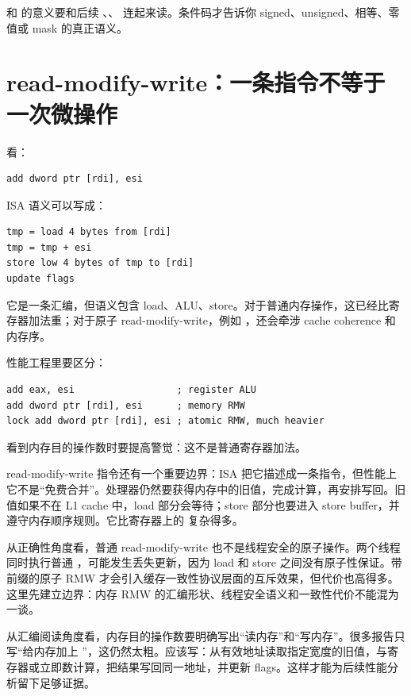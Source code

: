 \begin{keyidea}
 和  的意义要和后续 、、 连起来读。条件码才告诉你 signed、unsigned、相等、零值或 mask 的真正语义。
\end{keyidea}

\section{read-modify-write：一条指令不等于一次微操作}

看：

\begin{lstlisting}
add dword ptr [rdi], esi
\end{lstlisting}

ISA 语义可以写成：

\begin{lstlisting}
tmp = load 4 bytes from [rdi]
tmp = tmp + esi
store low 4 bytes of tmp to [rdi]
update flags
\end{lstlisting}

它是一条汇编，但语义包含 load、ALU、store。对于普通内存操作，这已经比寄存器加法重；对于原子 read-modify-write，例如 ，还会牵涉 cache coherence 和内存序。

性能工程里要区分：

\begin{lstlisting}
add eax, esi                  ; register ALU
add dword ptr [rdi], esi      ; memory RMW
lock add dword ptr [rdi], esi ; atomic RMW, much heavier
\end{lstlisting}

看到内存目的操作数时要提高警觉：这不是普通寄存器加法。

read-modify-write 指令还有一个重要边界：ISA 把它描述成一条指令，但性能上它不是“免费合并”。处理器仍然要获得内存中的旧值，完成计算，再安排写回。旧值如果不在 L1 cache 中，load 部分会等待；store 部分也要进入 store buffer，并遵守内存顺序规则。它比寄存器上的  复杂得多。

从正确性角度看，普通 read-modify-write 也不是线程安全的原子操作。两个线程同时执行普通 ，可能发生丢失更新，因为 load 和 store 之间没有原子性保证。带  前缀的原子 RMW 才会引入缓存一致性协议层面的互斥效果，但代价也高得多。这里先建立边界：内存 RMW 的汇编形状、线程安全语义和一致性代价不能混为一谈。

从汇编阅读角度看，内存目的操作数要明确写出“读内存”和“写内存”。很多报告只写“给内存加上 ”，这仍然太粗。应该写：从有效地址读取指定宽度的旧值，与寄存器或立即数计算，把结果写回同一地址，并更新 flags。这样才能为后续性能分析留下足够证据。

